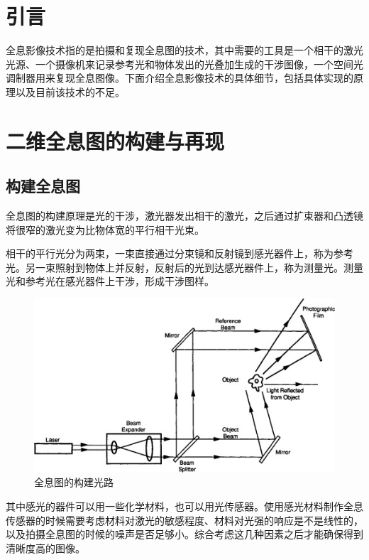\documentclass{article}
\begin{document}
\begin{multicols}{2}

\section{引言}

全息影像技术指的是拍摄和复现全息图的技术，其中需要的工具是一个相干的激光光源、一个摄像机来记录参考光和物体发出的光叠加生成的干涉图像，一个空间光调制器用来复现全息图像。下面介绍全息影像技术的具体细节，包括具体实现的原理以及目前该技术的不足。

\section{二维全息图的构建与再现}

\subsection{构建全息图}

全息图的构建原理是光的干涉，激光器发出相干的激光，之后通过扩束器和凸透镜将很窄的激光变为比物体宽的平行相干光束。

相干的平行光分为两束，一束直接通过分束镜和反射镜到感光器件上，称为参考光。另一束照射到物体上并反射，反射后的光到达感光器件上，称为测量光。测量光和参考光在感光器件上干涉，形成干涉图样。

\begin{figure}[H]
  \centering
  \includegraphics[width=0.9\linewidth]{figures/全息图的构建}
  \caption{全息图的构建光路}
\end{figure}

其中感光的器件可以用一些化学材料，也可以用光传感器。使用感光材料制作全息传感器的时候需要考虑材料对激光的敏感程度、材料对光强的响应是不是线性的，以及拍摄全息图的时候的噪声是否足够小。综合考虑这几种因素之后才能确保得到清晰度高的图像。


\end{multicols}
\end{document}
